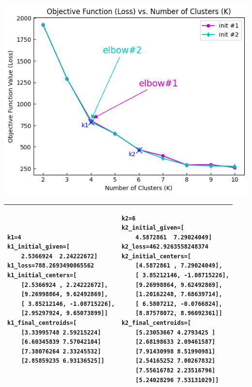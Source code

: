 \documentclass[twocolumn]{article}
\begin{document}
\begin{minipage}[t]{1\textwidth}
    \begin{minipage}[h]{8cm}
        \includegraphics[width=1\textwidth]{strategy2output.png}
    \end{minipage}
    \begin{tabular}[p]{|p{4cm}|p{4cm}|}
        \hline
        \begin{minipage}[t]{4cm}
            \begin{verbatim}
k1=4
k1_initial_given=[
    2.5366924  2.24222672]
k1_loss=788.2693490065562
k1_initial_centers=[
    [2.5366924 , 2.24222672],
    [9.26998864, 9.62492869],
    [ 3.85212146, -1.08715226],
    [2.95297924, 9.65073899]]
k1_final_centroids=[
    [3.33995748 2.59215224]
    [6.60345839 7.57042104]
    [7.38076264 2.33245532]
    [2.85859235 6.93136525]]\end{verbatim}
            \vspace{0.3\baselineskip}
        \end{minipage}
         & \begin{minipage}[t]{4cm}
               \begin{verbatim}
k2=6
k2_initial_given=[
    4.5872861  7.29024049]
k2_loss=462.9263558248374
k2_initial_centers=[
    [4.5872861 , 7.29024049],
    [ 3.85212146, -1.08715226],
    [9.26998864, 9.62492869],
    [1.20162248, 7.68639714],
    [ 6.5807212, -0.0766824],
    [8.87578072, 8.96092361]]
k2_final_centroids=[
    [5.23053667 4.2793425 ]
    [2.68198633 2.09461587]
    [7.91430998 8.51990981]
    [2.54165252 7.00267832]
    [7.55616782 2.23516796]
    [5.24028296 7.53131029]]\end{verbatim}
               \vspace{0.3\baselineskip}
           \end{minipage} \\ \hline
    \end{tabular}
\end{minipage}
\end{document}
